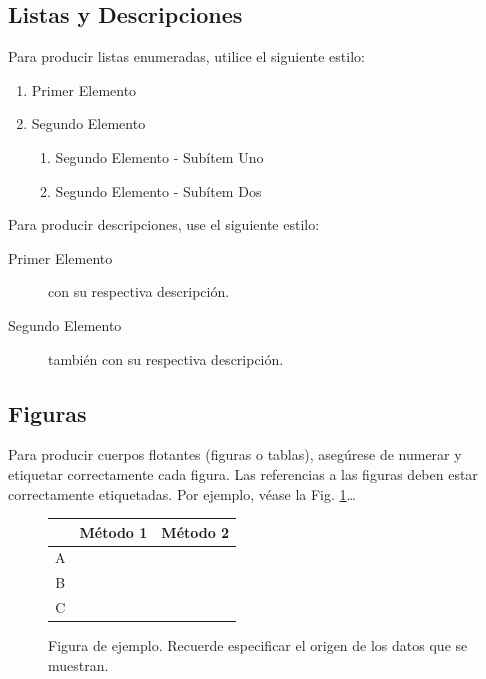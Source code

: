 \documentclass[a4paper,10pt,twocolumn]{article}
\begin{document}
	\subsection{Listas y Descripciones}\label{sub:lists}
		Para producir listas enumeradas, utilice el siguiente estilo:
		\begin{enumerate}
			\item Primer Elemento
			\item Segundo Elemento
			\begin {enumerate}
				\item {Segundo Elemento - Subítem Uno}
				\item {Segundo Elemento - Subítem Dos}
			\end {enumerate}
		\end{enumerate}

		Para producir descripciones, use el siguiente estilo:

		\begin{description}
			\item [Primer Elemento] con su respectiva descripción.
			\item [Segundo Elemento] también con su respectiva descripción.
		\end{description}

	\subsection{Figuras}\label{sub:figures}
		Para producir cuerpos flotantes (figuras o tablas), asegúrese de numerar
		y etiquetar correctamente cada figura. Las referencias a las figuras deben
		estar correctamente etiquetadas. Por ejemplo, véase la Fig. \ref{fig:ex}\ldots

		\begin{figure}[h!]%
		\begin{center}
			\begin{tabular}{|c|c|c|} \hline
			 			& Método 1 	& Método 2 	\\ \hline
			A 			&  			&  			\\ \hline
			B			& 			& 			\\ \hline
			C 			& 			&  			\\ \hline
			\end{tabular}
		\caption{Figura de ejemplo. Recuerde especificar el origen de los datos que se muestran. \label{fig:ex}}
		\end{center}
		\end{figure}
\end{document}
